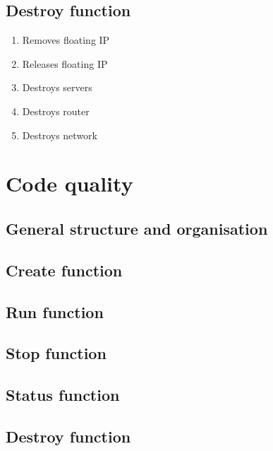 \documentclass{article}
\begin{document}
\subsection{Destroy function}
 \begin{enumerate}
    \item Removes floating IP
    \item Releases floating IP
    \item Destroys servers
    \item Destroys router
    \item Destroys network
  \end{enumerate}
  \vspace{10mm}
  
\section{Code quality}
   \subsection{General structure and organisation}
   
   \subsection{Create function}
     \vspace{10mm}
     
   \subsection{Run function}
     \vspace{10mm}
     
   \subsection{Stop function}
     \vspace{10mm}
     
   \subsection{Status function}
     \vspace{10mm}
     
   \subsection{Destroy function}
    
\end{document}

